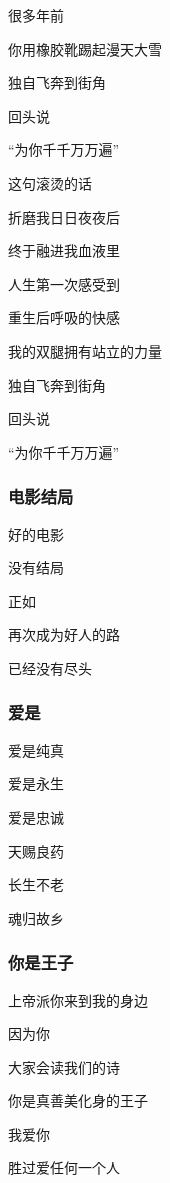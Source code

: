\documentclass[openany,scheme = chinese, linespread = 1.5]{ctexbook}
\begin{document}
\begin{center}
很多年前

你用橡胶靴踢起漫天大雪

独自飞奔到街角

回头说

“为你千千万万遍”

这句滚烫的话

折磨我日日夜夜后

终于融进我血液里

人生第一次感受到

重生后呼吸的快感

我的双腿拥有站立的力量

独自飞奔到街角

回头说

“为你千千万万遍”
\end{center}

\subsubsection*{电影结局}
\begin{center}
好的电影

没有结局

正如

再次成为好人的路

已经没有尽头
\end{center}

\subsubsection*{爱是}
\begin{center}
爱是纯真

爱是永生

爱是忠诚

天赐良药

长生不老

魂归故乡
\end{center}
\subsubsection*{你是王子}

\begin{center}
上帝派你来到我的身边

因为你

大家会读我们的诗

你是真善美化身的王子

我爱你

胜过爱任何一个人
\end{center}
\end{document}
